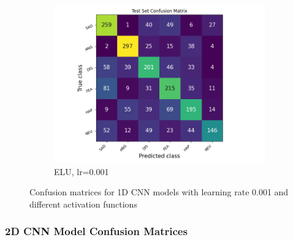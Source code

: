 \begin{figure}[h]
\begin{subfigure}[b]{0.32\textwidth}
        \includegraphics[width=\textwidth]{1D/lr0.001-ELU-1D-CF.png}
        \caption{ELU, lr=0.001}
    \end{subfigure}
    \caption{Confusion matrices for 1D CNN models with learning rate 0.001 and different activation functions}
    \label{fig:1d_confusion_matrices}
\end{figure}

\subsubsection{2D CNN Model Confusion Matrices}

